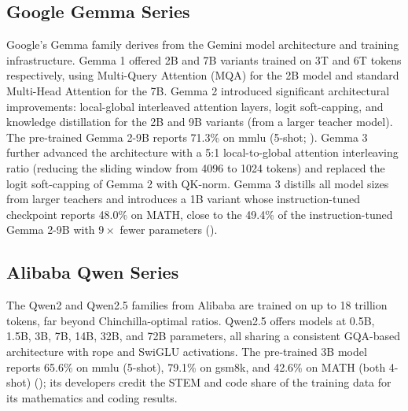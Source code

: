 \subsection{Google Gemma Series}
\label{subsubsec:gemma_series}
Google's Gemma family \citep{gemma2024} derives from the Gemini model architecture and training infrastructure. Gemma 1 offered 2B and 7B variants trained on 3T and 6T tokens respectively, using Multi-Query Attention (MQA) for the 2B model and standard Multi-Head Attention for the 7B. Gemma 2 \citep{gemma2team2024} introduced significant architectural improvements: local-global interleaved attention layers, logit soft-capping, and knowledge distillation for the 2B and 9B variants (from a larger teacher model). The pre-trained Gemma 2-9B reports 71.3\% on \gls{mmlu} (5-shot; \evC). Gemma 3 \citep{team2025gemma3} further advanced the architecture with a 5:1 local-to-global attention interleaving ratio (reducing the sliding window from 4096 to 1024 tokens) and replaced the logit soft-capping of Gemma 2 with QK-norm. Gemma 3 distills all model sizes from larger teachers and introduces a 1B variant whose instruction-tuned checkpoint reports 48.0\% on MATH, close to the 49.4\% of the instruction-tuned Gemma 2-9B with $9\times$ fewer parameters (\evC).

\subsection{Alibaba Qwen Series}
\label{subsubsec:qwen_series}
The Qwen2 \citep{yang2024qwen2} and Qwen2.5 \citep{qwen2024qwen25} families from Alibaba are trained on up to 18 trillion tokens, far beyond Chinchilla-optimal ratios. Qwen2.5 offers models at 0.5B, 1.5B, 3B, 7B, 14B, 32B, and 72B parameters, all sharing a consistent GQA-based architecture with \gls{rope} and SwiGLU activations. The pre-trained 3B model reports 65.6\% on \gls{mmlu} (5-shot), 79.1\% on \gls{gsm8k}, and 42.6\% on MATH (both 4-shot) (\evC); its developers credit the STEM and code share of the training data for its mathematics and coding results.

